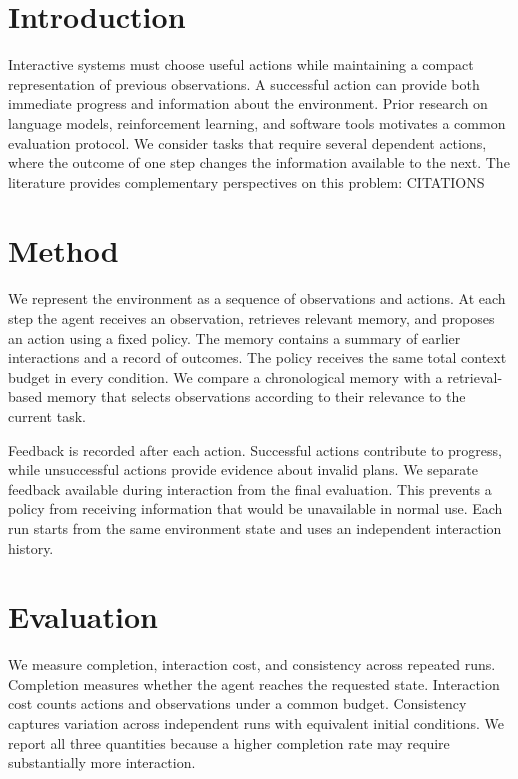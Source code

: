 \begin{abstract}
Language model agents combine learned representations with external actions.
We study how memory and feedback affect planning across interactive environments.
Our analysis separates the policy that proposes an action from the mechanism
that records observations. This separation supports reproducible comparisons
under a fixed interaction budget.
\end{abstract}

\section{Introduction}
Interactive systems must choose useful actions while maintaining a compact
representation of previous observations. A successful action can provide both
immediate progress and information about the environment. Prior research on
language models, reinforcement learning, and software tools motivates a common
evaluation protocol. We consider tasks that require several dependent actions,
where the outcome of one step changes the information available to the next.
The literature provides complementary perspectives on this problem: CITATIONS

\section{Method}
We represent the environment as a sequence of observations and actions.
At each step the agent receives an observation, retrieves relevant memory,
and proposes an action using a fixed policy. The memory contains a summary
of earlier interactions and a record of outcomes. The policy receives the
same total context budget in every condition. We compare a chronological
memory with a retrieval-based memory that selects observations according
to their relevance to the current task.

Feedback is recorded after each action. Successful actions contribute to
progress, while unsuccessful actions provide evidence about invalid plans.
We separate feedback available during interaction from the final evaluation.
This prevents a policy from receiving information that would be unavailable
in normal use. Each run starts from the same environment state and uses
an independent interaction history.

\section{Evaluation}
We measure completion, interaction cost, and consistency across repeated
runs. Completion measures whether the agent reaches the requested state.
Interaction cost counts actions and observations under a common budget.
Consistency captures variation across independent runs with equivalent
initial conditions. We report all three quantities because a higher
completion rate may require substantially more interaction.

